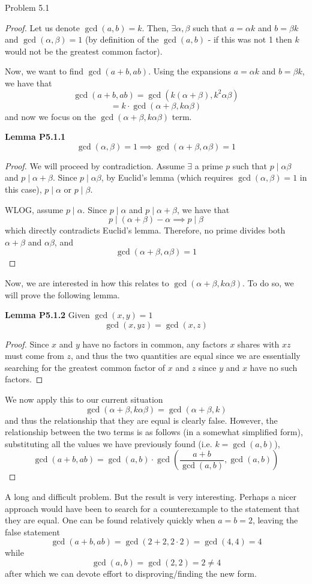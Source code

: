 \begin{sol}{Problem 5.1}
\begin{proof}
Let us denote $\gcd(a,b) = k$. Then, $\exists \alpha, \beta$ such that $a = \alpha k$ and $b = \beta k$ and $\gcd(\alpha, \beta) = 1$ (by definition of the $\gcd(a,b)$ - if this was not 1 then $k$ would not be the greatest common factor). 

Now, we want to find $\gcd(a+b, ab)$. Using the expansions $a = \alpha k$ and $b = \beta k$, we have that
\[
\gcd(a+b, ab) = \gcd(k(\alpha + \beta), k^2\alpha\beta)
\]
\[
= k \cdot \gcd(\alpha + \beta, k\alpha \beta)
\]
and now we focus on the $\gcd(\alpha + \beta, k\alpha \beta)$ term. 

\textbf{Lemma P5.1.1}
\[
\gcd(\alpha, \beta) = 1 \implies\gcd(\alpha + \beta, \alpha \beta) = 1
\]
\begin{proof}
We will proceed by contradiction. Assume $\exists$ a prime $p$ such that $p \mid \alpha \beta$ and $p \mid \alpha + \beta$. Since $p \mid \alpha \beta$, by Euclid's lemma (which requires $\gcd(\alpha, \beta) = 1$ in this case), $p \mid \alpha$ or $p \mid \beta$. 

WLOG, assume $p \mid \alpha$. Since $p \mid \alpha$ and $p \mid \alpha + \beta$, we have that
\[
p \mid (\alpha + \beta) - \alpha \implies p \mid \beta
\]
which directly contradicts Euclid's lemma. Therefore, no prime divides both $\alpha + \beta$ and $\alpha\beta$, and
\[
\gcd(\alpha + \beta, \alpha \beta) = 1
\]
\end{proof}

Now, we are interested in how this relates to $\gcd(\alpha + \beta, k\alpha \beta)$. To do so, we will prove the following lemma. 

\textbf{Lemma P5.1.2}
Given $\gcd(x, y) = 1$
\[
\gcd(x, yz) = \gcd(x, z)
\]
\begin{proof}
Since $x$ and $y$ have no factors in common, any factors $x$ shares with $xz$ must come from $z$, and thus the two quantities are equal since we are essentially searching for the greatest common factor of $x$ and $z$ since $y$ and $x$ have no such factors.
\end{proof}

We now apply this to our current situation
\[
\gcd(\alpha + \beta, k\alpha \beta) = \gcd(\alpha + \beta, k)
\]
and thus the relationship that they are equal is clearly false. However, the relationship between the two terms is as follows (in a somewhat simplified form), substituting all the values we have previously found (i.e. $k = \gcd(a, b)$),
\[
\boxed{\gcd(a+b, ab) = \gcd(a, b) \cdot \gcd\left(\frac{a+b}{\gcd(a, b)}, \gcd(a, b)\right)}
\]
\end{proof}

A long and difficult problem. But the result is very interesting. Perhaps a nicer approach would have been to search for a counterexample to the statement that they are equal. One can be found relatively quickly when $a = b = 2$, leaving the false statement
\[
\gcd(a+b, ab)  = \gcd(2 + 2, 2 \cdot 2) = \gcd (4, 4) = 4
\]
while
\[
\gcd(a, b) = \gcd(2, 2) = 2 \neq 4
\]
after which we can devote effort to disproving/finding the new form.
\end{sol}

